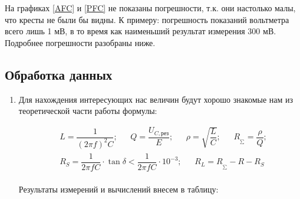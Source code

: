 \documentclass{lab}
\newcommand{\R}{R_{_{\sum}}}
\begin{document}
На графиках \ref{AFC} и \ref{PFC} не показаны погрешности, т.к. они настолько малы, что кресты
не были бы видны. К примеру: погрешность показаний вольтметра всего лишь 1 мВ, в то время как
наименьший результат измерения 300 мВ. Подробнее погрешности разобраны ниже.

\newpage

\subsection*{Обработка данных}

\begin{enumerate}

\item
Для нахождения интересующих нас величин будут хорошо знакомые нам из теоретической части работы
формулы:

\begin{equation}
\begin{aligned}
&L = \dfrac{1}{\left(2 \pi f\right)^2C}; ~~~~~~~ Q = \dfrac{U_{C, рез}}{E}; ~~~~~~~
\rho = \sqrt{\dfrac{L}{C}}; ~~~~~~~ \R = \dfrac{\rho}{Q};\\
&R_S = \dfrac{1}{2 \pi f C} \cdot \tan \delta < \dfrac{1}{2 \pi f C} \cdot 10^{-3}; ~~~~~~~
R_L = \R - R - R_S\\
\end{aligned}
\end{equation}

Результаты измерений и вычислений внесем в таблицу:


\end{enumerate}
\end{document}
